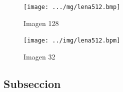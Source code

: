\documentclass{article}
\begin{document}
\begin{multicols}{2}
\begin{figure}[H]
\centering
\texttt{[image: .../mg/lena512.bmp]}
\caption{Imagen 128}
\label{Imagen 128}
\end{figure}

\begin{figure}[H]
\centering
\texttt{[image: ../img/lena512.bpm]}
\caption{Imagen 32}
\label{Imagen 32}
\end{figure}

\par 

\subsection{Subseccion}
\label{sec3}





\end{multicols}
\end{document}
